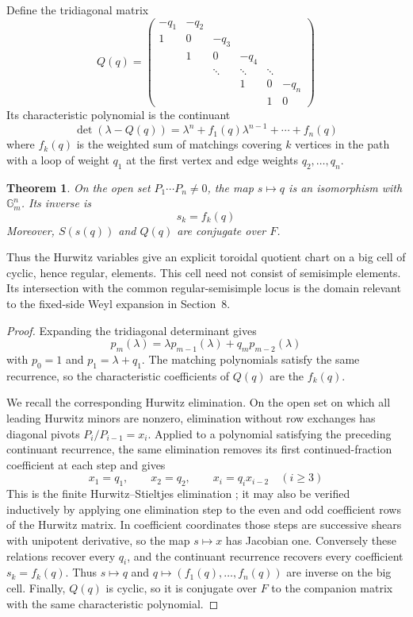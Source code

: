\documentclass[11pt]{amsart}
\newtheorem{theorem}{Theorem}[section]
\theoremstyle{definition}
\theoremstyle{remark}
\newcommand{\Gm}{\mathbb G_m}
\begin{document}
Define the tridiagonal matrix
\begin{equation}\label{eq:typeCI-Q}
 Q(q)=
 \begin{pmatrix}
 -q_1&-q_2&&&&\\
 1&0&-q_3&&&\\
 &1&0&-q_4&&\\
 &&\ddots&\ddots&\ddots&\\
 &&&1&0&-q_n\\
 &&&&1&0
 \end{pmatrix}
\end{equation}
Its characteristic polynomial is the continuant
\[
 \det(\lambda-Q(q))
 =\lambda^n+f_1(q)\lambda^{n-1}+\cdots+f_n(q)
\]
where $f_k(q)$ is the weighted sum of matchings covering $k$ vertices in the
path with a loop of weight $q_1$ at the first vertex and edge weights
$q_2,\ldots,q_n$.

\begin{theorem}\label{thm:typeCI-chart}
On the open set $P_1\cdots P_n\neq0$, the map $s\mapsto q$ is an isomorphism
with $\Gm^n$.  Its inverse is
\[
 s_k=f_k(q)
\]
Moreover, $S(s(q))$ and $Q(q)$ are conjugate over $F$.
\end{theorem}

Thus the Hurwitz variables give an explicit toroidal quotient chart on a big
cell of cyclic, hence regular, elements.  This cell need not consist of
semisimple elements.  Its intersection with the common regular-semisimple
locus is the domain relevant to the fixed-side Weyl expansion in Section~8.

\begin{proof}
Expanding the tridiagonal determinant gives
\[
 p_m(\lambda)=\lambda p_{m-1}(\lambda)+q_mp_{m-2}(\lambda)
\]
with $p_0=1$ and $p_1=\lambda+q_1$.  The matching polynomials satisfy the
same recurrence, so the characteristic coefficients of $Q(q)$ are the
$f_k(q)$.

We recall the corresponding Hurwitz elimination.  On the open set on which
all leading Hurwitz minors are nonzero, elimination without row exchanges has
diagonal pivots $P_i/P_{i-1}=x_i$.  Applied to a polynomial satisfying the
preceding continuant recurrence, the same elimination removes its first
continued-fraction coefficient at each step and gives
\[
 x_1=q_1,\qquad x_2=q_2,\qquad x_i=q_ix_{i-2}\quad(i\geq3)
\]
This is the finite Hurwitz--Stieltjes elimination
\cite{Gantmacher,HoltzTyaglov}; it may also be verified inductively by applying
one elimination step to the even and odd coefficient rows of the Hurwitz
matrix.  In coefficient coordinates those steps are successive shears with
unipotent derivative, so the map $s\mapsto x$ has Jacobian one.  Conversely these relations recover every
$q_i$, and the continuant recurrence recovers every coefficient $s_k=f_k(q)$.
Thus $s\mapsto q$ and $q\mapsto(f_1(q),\ldots,f_n(q))$ are inverse on the big
cell.  Finally, $Q(q)$ is cyclic, so it is conjugate over $F$ to the companion
matrix with the same characteristic polynomial.
\end{proof}
\end{document}
